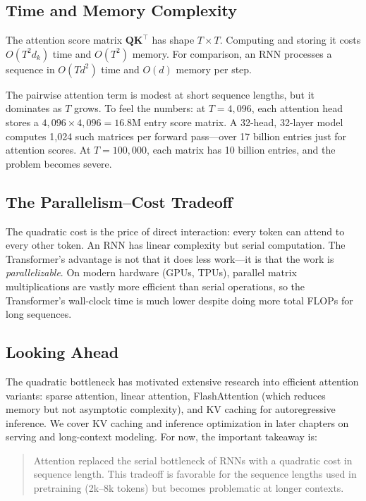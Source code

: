 \subsection{Time and Memory Complexity}

The attention score matrix $\mathbf{Q}\mathbf{K}^\top$ has shape $T \times T$. Computing and storing it costs $O(T^2 d_k)$ time and $O(T^2)$ memory. For comparison, an RNN processes a sequence in $O(T d^2)$ time and $O(d)$ memory per step.

The pairwise attention term is modest at short sequence lengths, but it dominates as $T$ grows. To feel the numbers: at $T = 4{,}096$, each attention head stores a $4{,}096 \times 4{,}096 = 16.8\text{M}$ entry score matrix. A 32-head, 32-layer model computes 1{,}024 such matrices per forward pass---over 17 billion entries just for attention scores. At $T = 100{,}000$, each matrix has 10 billion entries, and the problem becomes severe.

\subsection{The Parallelism--Cost Tradeoff}

The quadratic cost is the price of direct interaction: every token can attend to every other token. An RNN has linear complexity but serial computation. The Transformer's advantage is not that it does less work---it is that the work is \emph{parallelizable}. On modern hardware (GPUs, TPUs), parallel matrix multiplications are vastly more efficient than serial operations, so the Transformer's wall-clock time is much lower despite doing more total FLOPs for long sequences.

\subsection{Looking Ahead}

The quadratic bottleneck has motivated extensive research into efficient attention variants: sparse attention, linear attention, FlashAttention (which reduces memory but not asymptotic complexity), and KV caching for autoregressive inference. We cover KV caching and inference optimization in later chapters on serving and long-context modeling. For now, the important takeaway is:

\begin{quote}
Attention replaced the serial bottleneck of RNNs with a quadratic cost in sequence length. This tradeoff is favorable for the sequence lengths used in pretraining (2k--8k tokens) but becomes problematic at longer contexts.
\end{quote}

